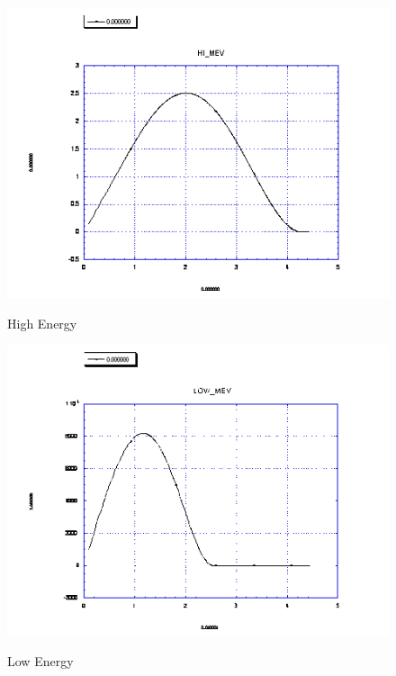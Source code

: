 \documentclass{../lab}
\begin{document}
\begin{figure}[h]
\captionsetup{justification=centering}
\begin{minipage}{0.32\linewidth}
    \href{http://experimentationlab.berkeley.edu/sites/default/files/images/BRAimage021.gif}{\includegraphics[width=\linewidth]{images/BRAimage021.png}}
    \caption{High Energy}
    \label{fig:021}
    \end{minipage} \hfill
    \begin{minipage}{0.32\linewidth}
    \href{http://experimentationlab.berkeley.edu/sites/default/files/images/480px-BRAimage020.gif}{\includegraphics[width=\linewidth]{images/480px-BRAimage020.png}}
    \caption{Low Energy}
    \label{fig:020}

\end{minipage}
\end{figure}
\end{document}
